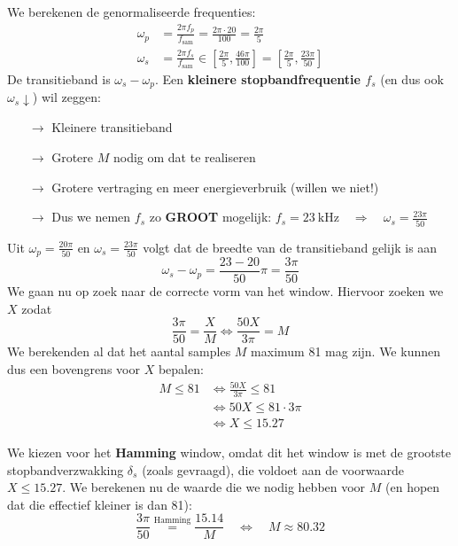 \documentclass{kuburgiearticle}
\newcommand{\sam}{\text{sam}}
\begin{document}
	We berekenen de genormaliseerde frequenties:
	\begin{align*}
		\omega_p &= \frac{2\pi f_p}{f_\sam} = \frac{2\pi \cdot 20}{100} = \frac{2\pi}{5} \\
		\omega_s &= \frac{2\pi f_s}{f_\sam} \in \left[\frac{2\pi}{5},\frac{46\pi}{100}\right] = \left[\frac{2\pi}{5},\frac{23\pi}{50}\right]
	\end{align*}
	De transitieband is \(\omega_s-\omega_p\). Een \textbf{kleinere stopbandfrequentie \(f_s\)} (en dus ook \(\omega_s \downarrow\)) wil zeggen:
	\begin{itemize}
		\item[\(\rightarrow\)] Kleinere transitieband
		\item[\(\rightarrow\)] Grotere \(M\) nodig om dat te realiseren
		\item[\(\rightarrow\)] Grotere vertraging en meer energieverbruik (willen we niet!)
		\item[\(\rightarrow\)] Dus we nemen \(f_s\) zo \textbf{GROOT} mogelijk: \(f_s=\SI{23}{\kilo\hertz} \quad \Longrightarrow \quad \omega_s = \frac{23\pi}{50}\)
	\end{itemize}

	Uit \(\omega_p = \frac{20\pi}{50}\) en \(\omega_s = \frac{23\pi}{50}\) volgt dat de breedte van de transitieband gelijk is aan \[\omega_s-\omega_p=\frac{23-20}{50}\pi = \frac{3\pi}{50}\]	We gaan nu op zoek naar de correcte vorm van het window. Hiervoor zoeken we \(X\) zodat \[\frac{3\pi}{50}=\frac{X}{M} \Leftrightarrow \frac{50X}{3\pi}=M\] We berekenden al dat het aantal samples \(M\) maximum 81 mag zijn. We kunnen dus een bovengrens voor \(X\) bepalen:
	\begin{align*}
		M \leq 81 & \Leftrightarrow \frac{50X}{3\pi} \leq 81 \\
					& \Leftrightarrow 50X \leq 81 \cdot 3\pi \\
					& \Leftrightarrow X \leq 15.27
	\end{align*}

	We kiezen voor het \textbf{Hamming} window, omdat dit het window is met de grootste stopbandverzwakking \(\delta_s\) (zoals gevraagd), die voldoet aan de voorwaarde \(X \leq 15.27\). We berekenen nu de waarde die we nodig hebben voor \(M\) (en hopen dat die effectief kleiner is dan 81):
	\begin{equation*}
		\frac{3\pi}{50} \overset{\text{Hamming}}{=} \frac{15.14}{M} \quad \Leftrightarrow \quad M \approx 80.32
	\end{equation*}
\end{document}
